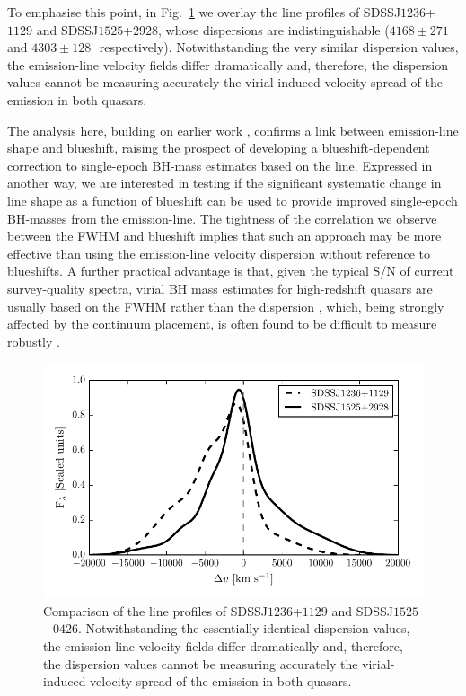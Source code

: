 To emphasise this point, in Fig.~\ref{fig:civ_comparison} we overlay the  line profiles of SDSSJ$1236$+$1129$ and SDSSJ$1525$+$2928$, whose dispersions are indistinguishable ($4168\pm271$ and $4303\pm128$\,\kms\, respectively). 
Notwithstanding the very similar dispersion values, the emission-line velocity fields differ dramatically and, therefore, the dispersion values cannot be measuring accurately the virial-induced velocity spread of the  emission in both quasars.

The analysis here, building on earlier work \citep[including][]{shen12, sulentic07}, confirms a link between  emission-line shape and blueshift, raising the prospect of developing a blueshift-dependent correction to single-epoch BH-mass estimates based on the  line. 
Expressed in another way, we are interested in testing if the significant systematic change in line shape as a function of  blueshift can be used to provide improved single-epoch BH-masses from the  emission-line.  
The tightness of the correlation we observe between the  FWHM and blueshift implies that such an approach may be more effective than using the  emission-line velocity dispersion without reference to blueshifts.
A further practical advantage is that, given the typical S/N of current survey-quality spectra, virial BH mass estimates for high-redshift quasars are usually based on the FWHM rather than the dispersion \citep[e.g.][]{shen11}, which, being strongly affected by the continuum placement, is often found to be difficult to measure robustly \citep[e.g.][]{mejia-restrepo16}. 

\begin{figure}
    \centering
    \includegraphics[width=\linewidth]{figures/chapter02/civ_comparison.pdf} 
    \caption[{Comparison of the  line profiles of SDSSJ$1236$+$1129$ and SDSSJ$1525$+$0426$.}]{Comparison of the  line profiles of SDSSJ$1236$+$1129$ and SDSSJ$1525$+$0426$. Notwithstanding the essentially identical dispersion values, the emission-line velocity fields differ dramatically and, therefore, the dispersion values cannot be measuring accurately the virial-induced velocity spread of the  emission in both quasars. }
    \label{fig:civ_comparison}
\end{figure}

